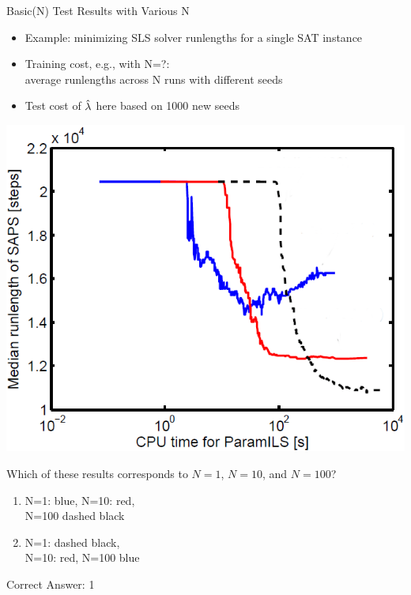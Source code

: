 \begin{frame}[fragile]{Basic(N) Test Results with Various N}

\begin{itemize}
\item Example: minimizing SLS solver runlengths for a single SAT instance
\item \alert{Training cost}, e.g., with N=?:\\average runlengths across N runs with different seeds
\item \alert{Test cost} of $\hat{\mathbf{\lambda}}$ here based on 1000 new seeds 
\end{itemize}	

\pause

\begin{multicols}{2}
\begin{center}
\includegraphics[scale=0.2]{images/basicils_unlabled.png}
\end{center}
\columnbreak{}
\pause
Which of these results corresponds to $N=1$, $N=10$, and $N=100$?\\


\pause
\medskip

\begin{enumerate}
\item N=1: blue, N=10: red,\\ N=100 dashed black
\item N=1: dashed black,\\ N=10: red, N=100 blue
\end{enumerate}

\pause
Correct Answer: 1


\end{multicols}


\end{frame}



